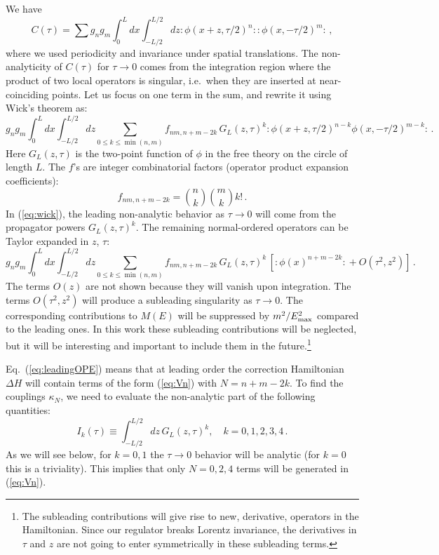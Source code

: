 \documentclass[11pt]{article}
\newcommand{\purp}{\color [rgb]{0.6,0.1,0.7}}
\newcommand{\LV}[1]{{\purp\bf [LV: #1]}}
\newcommand{\reef}[1]{(\ref{#1})}
\newcommand{\beq}{\begin{equation}}
\newcommand{\eeq}{\end{equation}}
\def\le{\leqslant}
\newcommand{\NO}[1]{{:\!#1\!:}}
\def \Emax{E_{\rm max}}
\numberwithin{equation}{section}
\begin{document}
We have 
%
\begin{equation}
\label{eq:ctau1}
C(\tau) =\sum g_n g_m \int_0^L d x \int_{-L/2}^{L/2} d z \NO{\phi(x+z, \tau/2)^{n}}\NO{\phi(x,-\tau/2)^{m}} \,,
\end{equation}
where we used periodicity and invariance under spatial translations. The non-analyticity of $C(\tau)$ for $\tau \to 0$ comes from the integration region where the product of two local operators is singular, i.e.~when they are inserted at near-coinciding points. Let us focus on one term in the sum, and rewrite it using Wick's theorem as:
\beq
g_n g_m \int_0^L d x \int_{-L/2}^{L/2} d z \sum_{0\le k\le \min(n,m)} f_{nm,n+m-2k}\, G_L(z,\tau)^k\NO{\phi(x+z, \tau/2)^{n-k}\phi(x,-\tau/2)^{m-k}} \,.
\label{eq:wick}
\eeq
Here $G_L(z,\tau)$ is the two-point function of $\phi$ in the free theory on the circle of length $L$. The $f$'s are integer combinatorial factors (operator product expansion coefficients):
\beq
f_{nm,n+m-2k}=\binom{n}{k} \binom{m}{k} k!\,.
\eeq
In \reef{eq:wick}, the leading non-analytic behavior as $\tau\to0$ will come from the propagator powers $G_L(z,\tau)^k$. The remaining normal-ordered operators can be Taylor expanded in $z$, $\tau$:
\beq
\label{eq:leadingOPE}
g_n g_m \int_0^L d x \int_{-L/2}^{L/2} d z \sum_{0\le k\le \min(n,m)} f_{nm,n+m-2k}\, G_L(z,\tau)^k\,[\NO{\phi(x)^{n+m-2k}}+O(\tau^2,z^2)]\,.
\eeq
The terms $O(z)$ are not shown because they will vanish upon integration. The terms $O(\tau^2,z^2)$ will produce a subleading singularity as $\tau\to 0$. The corresponding contributions to $M(E)$ will be suppressed by $m^2/\Emax^2$ compared to the leading ones. In this work these subleading contributions will be neglected, but it will be interesting and important to include them in the future.\footnote{The subleading contributions will give rise to new, derivative, operators in the Hamiltonian. Since our regulator breaks Lorentz invariance, the derivatives in $\tau$ and $z$ are not going to enter symmetrically in these subleading terms.}

Eq.~\reef{eq:leadingOPE} means that at leading order the correction Hamiltonian $\Delta H$ will contain terms of the form \reef{eq:Vn} with $N=n+m-2k$. To find the couplings $\kappa_N$, we need to evaluate the non-analytic part of the following quantities:
%
\begin{equation}
\label{eq:Iktau}
I_k(\tau) \equiv \int_{-L/2}^{L/2} d z \,  G_L(z,\tau)^k,\quad k=0,1,2,3,4\,.
\end{equation}
%
As we will see below, for $k=0,1$ the $\tau\to 0$ behavior will be analytic (for $k=0$ this is a triviality). This implies that only $N=0,2,4$ terms will be generated in \reef{eq:Vn}. 
\end{document}
